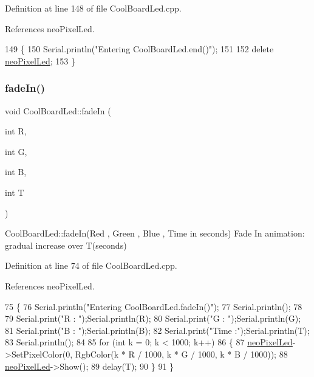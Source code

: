 Definition at line 148 of file Cool\+Board\+Led.\+cpp.



References neo\+Pixel\+Led.


\begin{DoxyCode}
149 \{
150     Serial.println(\textcolor{stringliteral}{"Entering CoolBoardLed.end()"});
151 
152     \textcolor{keyword}{delete} \hyperlink{classCoolBoardLed_ac2c13fa462a010cd9242bf297c013923}{neoPixelLed};
153 \}
\end{DoxyCode}
\mbox{\label{classCoolBoardLed_aec915442a8441c7cd45c3279d3ff8821}} 
\subsubsection{\texorpdfstring{fade\+In()}{fadeIn()}}
{\footnotesize\ttfamily void Cool\+Board\+Led\+::fade\+In (\begin{DoxyParamCaption}\item[{int}]{R,  }\item[{int}]{G,  }\item[{int}]{B,  }\item[{int}]{T }\end{DoxyParamCaption})}

Cool\+Board\+Led\+::fade\+In(\+Red , Green , Blue , Time in seconds) Fade In animation\+: gradual increase over T(seconds) 

Definition at line 74 of file Cool\+Board\+Led.\+cpp.



References neo\+Pixel\+Led.


\begin{DoxyCode}
75 \{
76     Serial.println(\textcolor{stringliteral}{"Entering CoolBoardLed.fadeIn()"});
77     Serial.println();
78 
79     Serial.print(\textcolor{stringliteral}{"R : "});Serial.println(R);
80     Serial.print(\textcolor{stringliteral}{"G : "});Serial.println(G);
81     Serial.print(\textcolor{stringliteral}{"B : "});Serial.println(B);
82     Serial.print(\textcolor{stringliteral}{"Time :"});Serial.println(T);
83     Serial.println();   
84 
85     \textcolor{keywordflow}{for} (\textcolor{keywordtype}{int} k = 0; k < 1000; k++) 
86     \{
87         \hyperlink{classCoolBoardLed_ac2c13fa462a010cd9242bf297c013923}{neoPixelLed}->SetPixelColor(0, RgbColor(k * R / 1000, k * G / 1000, k * B / 1000));
88         \hyperlink{classCoolBoardLed_ac2c13fa462a010cd9242bf297c013923}{neoPixelLed}->Show();
89         delay(T);
90     \}
91 \}
\end{DoxyCode}
\mbox{\label{classCoolBoardLed_a27c4e14fa2cd3639c0844152cea98887}} 
